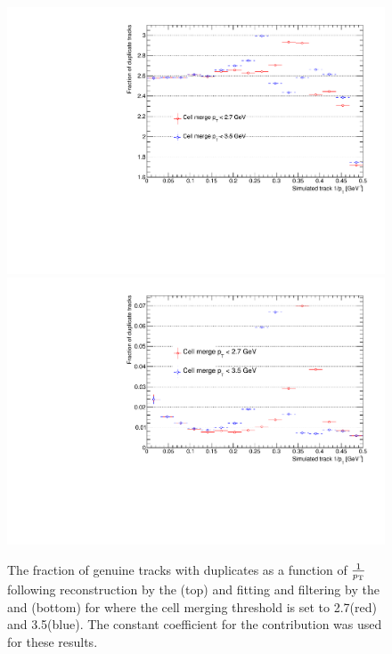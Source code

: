 \begin{figure}[tbp]
\centering
\includegraphics[width=\textwidth]{figs/tk-upgrade/results-lowPtTracking/htFracDuplicatesVsInvPtTiltedGeometry_5000.pdf}
\\
\includegraphics[width=\textwidth]{figs/tk-upgrade/results-lowPtTracking/kfFracDuplicatesVsInvPtTiltedGeometry_5000.pdf}
\caption{The fraction of genuine tracks with duplicates as a function of $\frac{1}{p_{\mathrm{T}}}$ following reconstruction by the \HT (top) and fitting and filtering by the \KF and \DR (bottom) for where the \HT cell merging \pT threshold is set to 2.7\GeV (red) and 3.5\GeV (blue). 
The constant coefficient for the \MS contribution was used for these \KF results.
}
\label{fig:2GeVfracDups}
\end{figure}

